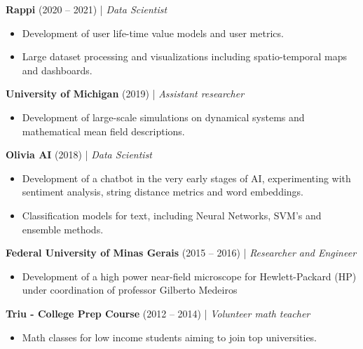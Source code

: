 \documentclass[10pt,a4paper]{article}
\begin{document}
\vspace{4pt}

\textbf{Rappi} (2020 -- 2021) | \textit{Data Scientist} 
\begin{itemize}[noitemsep, topsep=0pt]
	\item Development of user life-time value models and user metrics.
	\item Large dataset processing and visualizations including spatio-temporal maps and dashboards.
\end{itemize}

\vspace{4pt}

\textbf{University of Michigan} (2019) | \textit{Assistant researcher} 
\begin{itemize}[noitemsep, topsep=0pt]
	\item Development of large-scale simulations on dynamical systems and mathematical mean field descriptions.
\end{itemize}

\vspace{4pt}

\textbf{Olivia AI} (2018) | \textit{Data Scientist} 
\begin{itemize}[noitemsep, topsep=0pt]
	\item Development of a chatbot in the very early stages of AI, experimenting with sentiment analysis, string distance metrics and word embeddings.
	\item Classification models for text, including Neural Networks, SVM's and ensemble methods.
\end{itemize}

\vspace{4pt}

\textbf{Federal University of Minas Gerais} (2015 -- 2016) | \textit{Researcher and Engineer} 
\begin{itemize}[noitemsep, topsep=0pt]
	\item Development of a high power near-field microscope for Hewlett-Packard (HP) under coordination of professor Gilberto Medeiros
\end{itemize}

\vspace{4pt}

\textbf{Triu - College Prep Course} (2012 -- 2014) | \textit{Volunteer math teacher} 
\begin{itemize}[noitemsep, topsep=0pt]
	\item Math classes for low income students aiming to join top universities.
\end{itemize}
\end{document}
